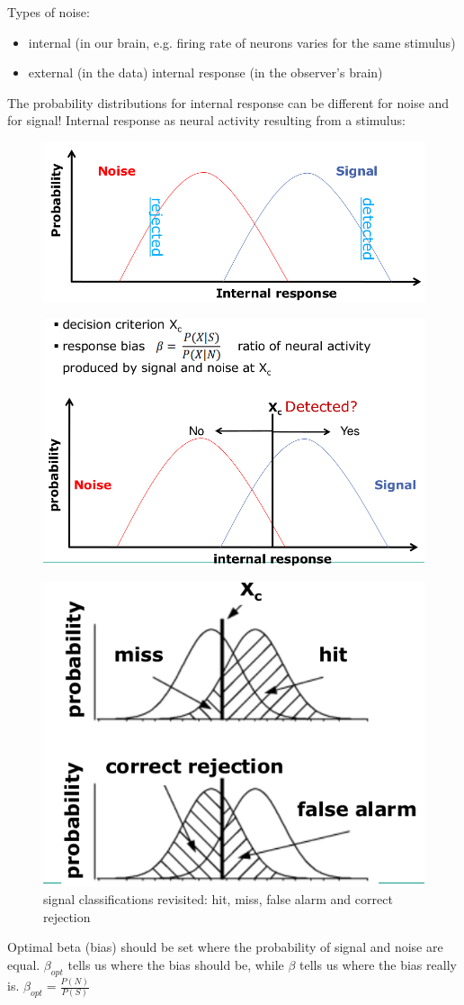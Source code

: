 Types of noise:
\begin{itemize}
\item internal (in our brain, e.g. firing rate of neurons varies for the same stimulus)
\item external (in the data) internal response (in the observer's brain)
\end{itemize}
The probability distributions for internal response can be different for noise and for signal! Internal response as neural activity resulting from a stimulus:
\begin{figure}[h!]
	\centering
	\includegraphics[width=.5\textwidth]{img/ch03_std.png}
	\caption{}
	\label{std}
\end{figure} 
\begin{figure}[h!]
	\centering
	\includegraphics[width=.5\textwidth]{img/ch03_std1.png}
	\caption{}
	\label{std1}
\end{figure} 
\begin{figure}[h!]
	\centering
	\includegraphics[width=.3\textwidth]{img/ch03_std2.png}
	\caption{signal classifications revisited: hit, miss, false alarm and correct rejection}
	\label{std2}
\end{figure} 
Optimal beta (bias) should be set where the probability of signal and noise are equal. $\beta_{opt}$ tells us where the bias should be, while $\beta$ tells
us where the bias really is. $\beta_{opt} = \frac{P(N)}{P(S)}$\\
